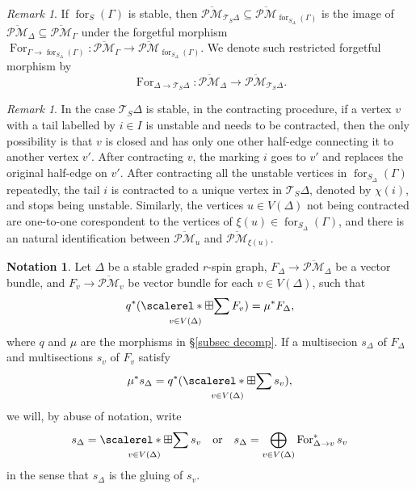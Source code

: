 \documentclass[11pt]{amsart}
\theoremstyle{definition}
\newtheorem{nn}[dummy]{Notation}
\theoremstyle{remark}
\newtheorem{rmk}[dummy]{Remark}
\newcommand{\oPMb}{{\overline{\mathcal{PM}}}}
\newcommand{\<}{\left<}
\renewcommand{\>}{\right>}
\numberwithin{equation}{section}
\DeclareMathOperator*{\bboxplus}{\scalerel*{\boxplus}{\sum}}
\begin{document}
    \begin{rmk}\label{rmk on forget morphism on strata}
   If $\operatorname{for}_{S}(\Gamma)$ is stable, then $\oPMb_{\mathcal T_S \Delta}\subseteq \oPMb_{\operatorname{for}_{S_\Delta}(\Gamma)}$ is the image of $\oPMb_{\Delta}\subseteq \oPMb_{\Gamma}$ under the forgetful morphism
    $\operatorname{For}_{\Gamma \to \operatorname{for}_{S_\Delta}(\Gamma)}\colon \oPMb_{\Gamma}\to \oPMb_{\operatorname{for}_{S_\Delta}(\Gamma)}$. We denote such restricted forgetful morphism by
    $$
    \operatorname{For}_{\Delta \to {\mathcal T_S \Delta}}\colon \oPMb_{\Delta}\to \oPMb_{\mathcal T_S \Delta}.
    $$
        
    \end{rmk}

    \begin{rmk}\label{rmk on contract after forget}
    In the case $\mathcal T_S \Delta$ is stable, in the contracting procedure, if a vertex $v$ with a tail labelled by $i\in I$ is unstable and needs to be contracted, then the only possibility is that $v$ is closed and has only one other half-edge connecting it to another vertex $v'$. After contracting $v$, the marking $i$ goes to $v'$ and replaces the original half-edge on $v'$. After contracting all the unstable vertices in $\operatorname{for}_{S_{\Delta}}(\Gamma)$ repeatedly,  the tail $i$ is contracted to a unique vertex in $\mathcal T_S \Delta$, denoted by $\chi(i)$,  and stops being unstable. Similarly, the vertices $u\in V(\Delta)$ not being contracted are one-to-one corespondent to the vertices of  $\xi(u) \in \operatorname{for}_{S_{\Delta}}(\Gamma)$, and there is an natural identification between $\oPMb_u$ and $\oPMb_{\xi(u)}$.
    \end{rmk}

    \begin{nn}\label{nn bad notation}
        Let $\Delta$ be a stable graded $r$-spin graph, $F_\Delta\to \oPMb_\Delta$ be a vector bundle, and $F_v\to \oPMb_v$ be vector bundle for each $v\in V(\Delta)$, such %
that 
        $$
        q^*(\bboxplus_{v\in V(\Delta)}F_v)=\mu^* F_\Delta,
        $$
        where %
$q$ and $\mu$ are the morphisms in \S\ref{subsec decomp}. If a multisecion $s_\Delta$ of $F_\Delta$ and multisections $s_v$ of $F_v$ satisfy
        $$
        \mu^* s_\Delta=q^*(\bboxplus_{v\in V(\Delta)}s_v),
        $$
        we will, by abuse of notation, write
        $$
        s_\Delta=\bboxplus_{v\in V(\Delta)}s_v\quad \text{or} \quad s_\Delta=\bigoplus_{v\in V(\Delta)} \operatorname{For}^*_{\Delta \to v} s_v
        $$
        in the sense that $s_\Delta$ is the gluing of $s_v$.
    \end{nn}
    
\end{document}
